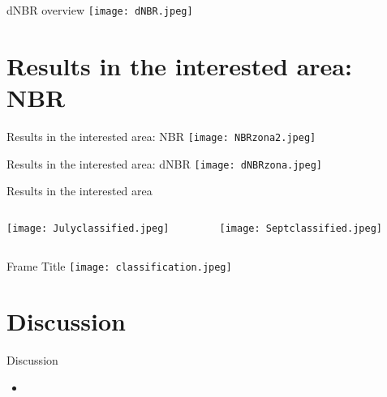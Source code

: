 \documentclass{beamer}
\begin{document}
\begin{frame}{dNBR overview}
  \texttt{[image: dNBR.jpeg]}  
\end{frame}

\section{Results in the interested area: NBR}
\begin{frame}{Results in the interested area: NBR}
\texttt{[image: NBRzona2.jpeg]}
\end{frame}

\begin{frame}{Results in the interested area: dNBR}
\texttt{[image: dNBRzona.jpeg]}
\end{frame}

\begin{frame}{Results in the interested area}
\begin{columns}
    \begin{column}{0.5\textwidth}
        \texttt{[image: Julyclassified.jpeg]}
    \end{column}
    \begin{column}{0.5\textwidth}
    \texttt{[image: Septclassified.jpeg]}
    \end{column}
\end{columns}
\end{frame}


\begin{frame}{Frame Title}
\texttt{[image: classification.jpeg]}
\end{frame}


\section{Discussion}
\begin{frame}{Discussion}
\begin{itemize}
    \item 
\end{itemize}
    
\end{frame}

    
\end{document}
